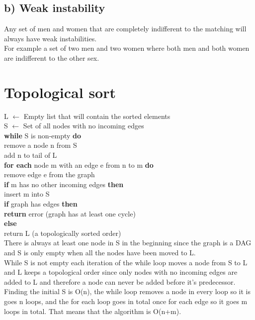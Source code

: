 \documentclass[a4paper]{article}
\begin{document}
\subsection*{b) Weak instability}
Any set of men and women that are completely indifferent to the matching will always have weak instabilities.\\
For example a set of two men and two women where both men and both women are indifferent to the other sex.

\section{Topological sort}
L $\leftarrow$ Empty list that will contain the sorted elements\\
S $\leftarrow$ Set of all nodes with no incoming edges\\
\textbf{while} S is non-empty \textbf{do}\\
\indent remove a node n from S\\
\indent add n to tail of L\\
\indent \textbf{for each }node m with an edge e from n to m \textbf{do}\\
\indent \indent remove edge e from the graph\\
\indent \indent \textbf{if} m has no other incoming edges \textbf{then}\\
\indent \indent \indent insert m into S\\
\textbf{if} graph has edges \textbf{then}\\
\indent \textbf{return} error (graph has at least one cycle)\\
\textbf{else} \\
\indent return L (a topologically sorted order)\\

There is always at least one node in S in the beginning since the graph is a DAG and
S is only empty when all the nodes have been moved to L. \\
While S is not empty each iteration of the while loop moves a node from S to L and L keeps a topological order since only nodes with no incoming edges are added to L and therefore a node can never be added before it's predecessor.\\
Finding the initial S is O(n), the while loop removes a node in every loop so it is goes n loops, and the for each loop goes in total once for each edge so it goes m loops in total. That means that the algorithm is O(n+m).
\end{document}

